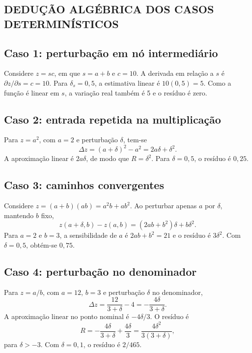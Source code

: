 \documentclass[12pt,openright,oneside,a4paper,brazil]{abntex2}
\begin{document}
\begin{apendicesenv}
\chapter{DEDUÇÃO ALGÉBRICA DOS CASOS DETERMINÍSTICOS}

\section{Caso 1: perturbação em nó intermediário}
Considere $z=sc$, em que $s=a+b$ e $c=10$. A derivada em relação a $s$ é $\partial z/\partial s=c=10$. Para $\delta_s=0{,}5$, a estimativa linear é $10(0{,}5)=5$. Como a função é linear em $s$, a variação real também é 5 e o resíduo é zero.

\section{Caso 2: entrada repetida na multiplicação}
Para $z=a^2$, com $a=2$ e perturbação $\delta$, tem-se
\begin{equation}
\Delta z=(a+\delta)^2-a^2=2a\delta+\delta^2.
\end{equation}
A aproximação linear é $2a\delta$, de modo que $R=\delta^2$. Para $\delta=0{,}5$, o resíduo é $0{,}25$.

\section{Caso 3: caminhos convergentes}
Considere $z=(a+b)(ab)=a^2b+ab^2$. Ao perturbar apenas $a$ por $\delta$, mantendo $b$ fixo,
\begin{equation}
z(a+\delta,b)-z(a,b)=(2ab+b^2)\delta+b\delta^2.
\end{equation}
Para $a=2$ e $b=3$, a sensibilidade de $a$ é $2ab+b^2=21$ e o resíduo é $3\delta^2$. Com $\delta=0{,}5$, obtém-se $0{,}75$.

\section{Caso 4: perturbação no denominador}
Para $z=a/b$, com $a=12$, $b=3$ e perturbação $\delta$ no denominador,
\begin{equation}
\Delta z=\frac{12}{3+\delta}-4=-\frac{4\delta}{3+\delta}.
\end{equation}
A aproximação linear no ponto nominal é $-4\delta/3$. O resíduo é
\begin{equation}
R=-\frac{4\delta}{3+\delta}+\frac{4\delta}{3}=\frac{4\delta^2}{3(3+\delta)},
\end{equation}
para $\delta>-3$. Com $\delta=0{,}1$, o resíduo é $2/465$.


\end{apendicesenv}
\end{document}
